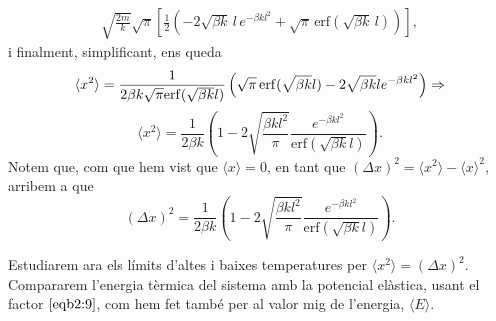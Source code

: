 \documentclass[a4paper, 10pt]{article}
\begin{document}
\begin{enumerate}
\begin{align*}
	\sqrt{\frac{2m}{k}}\sqrt{\pi}
	\left[
	\frac{1}{2}\left(
	-2\sqrt{\beta k}\,l\, e^{-\beta k l^2}
	+ \sqrt{\pi}\,\mathrm{erf}(\sqrt{\beta k}\,l)
	\right)
	\right],
\end{align*}
	i finalment, simplificant, ens queda 
	\begin{equation*}
		\langle x^2 \rangle = \frac{1}{2\beta k \sqrt{\pi}\mathrm{erf}(\sqrt{\beta k} l)}\left( \sqrt{\pi}\erf(\sqrt{\beta k} l)-2\sqrt{\beta k} l e^{-\beta k l^2}\right)\Rightarrow
	\end{equation*}
	\begin{equation}
		\boxed{\langle x^2 \rangle = \frac{1}{2\beta k}\left( 1 - 2\sqrt{\frac{\beta k l^2}{\pi}}\frac{e^{-\beta k l^2}}{\mathrm{erf}(\sqrt{\beta k} l)}\right)}.
	\end{equation}
	Notem que, com que hem vist que $\langle x \rangle = 0$, en tant que $(\Delta x)^2 = \langle x^2 \rangle - \langle x \rangle ^2 $, arribem a que
	\begin{equation}
		\boxed{(\Delta x)^2 = \frac{1}{2\beta k}\left( 1 - 2\sqrt{\frac{\beta k l^2}{\pi}}\frac{e^{-\beta k l^2}}{\mathrm{erf}(\sqrt{\beta k} l)}\right)}.
	\end{equation}
	
	Estudiarem ara els límits d'altes i baixes temperatures per $\langle x^2 \rangle = (\Delta x)^2$. Compararem l'energia tèrmica del sistema amb la potencial elàstica, usant el factor $\eqref{eqb2:9}$, com hem fet també per al valor mig de l'energia, $\langle E \rangle$. 
	

\end{enumerate}
\end{document}
